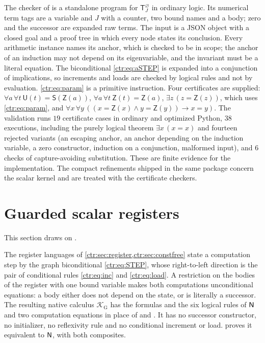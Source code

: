 The checker of  is a standalone program for $\mathsf T_J^{\varnothing}$ in
ordinary logic. Its numerical term tags are a variable and $J$ with a counter, two bound
names and a body; zero and the successor are expanded raw terms. The input is a JSON object
with a closed goal and a proof tree in which every node states its conclusion. Every
arithmetic instance names its anchor, which is checked to be in scope; the anchor of an
induction may not depend on its eigenvariable, and the invariant must be a literal
equation. The biconditional \eqref{ctr:eq:aSTEP} is expanded into a conjunction of
implications, so increments and loads are checked by logical rules and not by evaluation.
\eqref{ctr:eq:param} is a primitive instruction. Four certificates are supplied:
$\forall a\,\forall t\ \mathsf U(t)=\mathsf S(\mathsf Z(a))$,
$\forall a\,\forall t\ \mathsf Z(t)=\mathsf Z(a)$, $\exists z\,(z=\mathsf Z(z))$, which uses
\eqref{ctr:eq:param}, and
$\forall x\,\forall y\,((x=\mathsf Z(x)\land y=\mathsf Z(y))\to x=y)$. The validation runs
$19$ certificate cases in ordinary and optimized Python, $38$ executions, including the
purely logical theorem $\exists x\,(x=x)$ and fourteen rejected variants (an escaping
anchor, an anchor depending on the induction variable, a zero constructor, induction on a
conjunction, malformed input), and $6$ checks of capture-avoiding substitution. These are
finite evidence for the implementation. The compact refinements shipped in the same package
concern the scalar kernel and are treated with the certificate checkers.

\section{Guarded scalar registers}\label{ctr:sec:guarded}

This section draws on .

The register languages of \cref{ctr:sec:register,ctr:sec:constfree} state a computation
step by the graph biconditional \eqref{ctr:eq:STEP}, whose right-to-left direction is the
pair of conditional rules \eqref{ctr:eq:inc} and \eqref{ctr:eq:load}. A restriction on the
bodies of the register with one bound variable makes both computations unconditional
equations: a body either does not depend on the state, or is literally a successor. The
resulting native calculus $\mathcal K_{\mathrm G}$ has the formulas and the six logical rules
of $\mathsf{N}$ and two computation equations in place of  and . It has
no successor constructor, no initializer, no reflexivity rule and no conditional increment
or load.  proves it equivalent to $\mathsf{N}$, with both composites.

